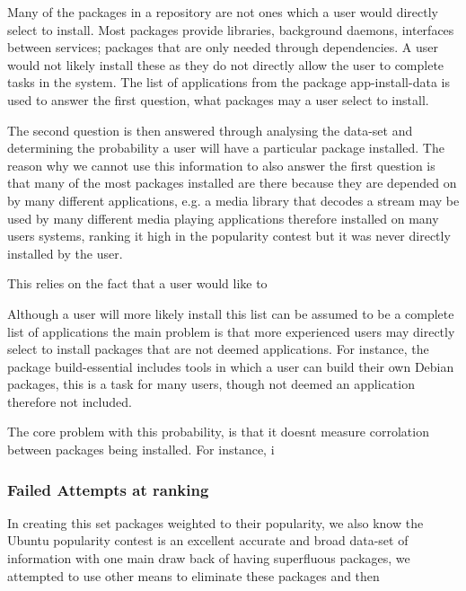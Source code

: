 Many of the packages in a repository are not ones which a user would directly select to install.
Most packages provide libraries, background daemons, interfaces between services; packages that are only needed through dependencies.
A user would not likely install these as they do not directly allow the user to complete tasks in the system.
The list of applications from the package app-install-data is used to answer the first question, what packages may a user select to install.

The second question is then answered through analysing the data-set and determining the probability a user will have a particular package installed.
The reason why we cannot use this information to also answer the first question is that many of the most packages installed are there because they are depended on by many different applications,
e.g. a media library that decodes a stream may be used by many different media playing applications therefore installed on many users systems, 
ranking it high in the popularity contest but it was never directly installed by the user.


This relies on the fact that a user would like to 

Although a user will more likely install this list can be assumed to be a complete list of applications 
the main problem is that more experienced users may directly select to install packages that are not deemed applications.
For instance, the package build-essential includes tools in which a user can build their own Debian packages,
this is a task for many users, though not deemed an application therefore not included.

The core problem with this probability, is that it doesnt measure corrolation between packages being installed.
For instance, i


\subsubsection{Failed Attempts at ranking}
In creating this set packages weighted to their popularity, we also  know the Ubuntu popularity contest is an excellent accurate and broad data-set of information with one main draw back of having superfluous packages,
we attempted to use other means to eliminate these packages and then  

